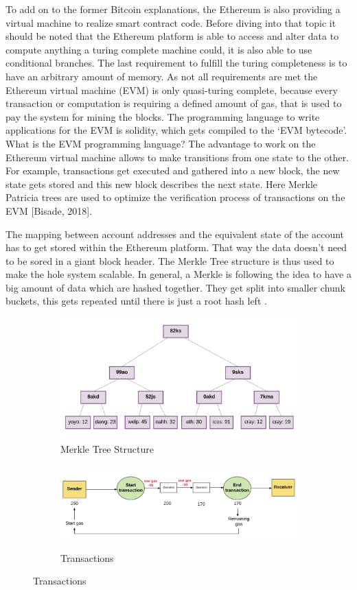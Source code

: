 To add on to the former Bitcoin explanations, the Ethereum is also providing a virtual machine to realize smart contract code. 
Before diving into that topic it should be noted that the Ethereum platform is able to access and alter data to compute anything a turing complete machine could, it is also able to use conditional branches. 
The last requirement to fulfill the turing completeness is to have an arbitrary amount of memory. 
As not all requirements are met the Ethereum virtual machine (EVM) is only quasi-turing complete, because every transaction or computation is requiring a defined amount of gas, that is used to pay the system for mining the blocks. 
The programming language to write applications for the EVM is solidity, which gets compiled to the ‘EVM bytecode’. 
What is the EVM programming language?
The advantage to work on the Ethereum virtual machine allows to make transitions from one state to the other. For example, transactions get executed and gathered into a new block, the new state gets stored and this new block describes the next state.
Here Merkle Patricia trees are used to optimize the verification process of transactions on the EVM [Bisade, 2018].

The mapping between account addresses and the equivalent state of the account has to get stored within the Ethereum platform. That way the data doesn’t need to be sored in a giant block header.
The Merkle Tree structure is thus used to make the hole system scalable. 
In general, a Merkle is following the idea to have a big amount of data which are hashed together. 
They get split into smaller chunk buckets, this gets repeated until there is just a root hash left \cite{Buterin2015}.

\begin{figure}
  \begin{subfigure}{0.5\textwidth}
    \centering
    \includegraphics[width=0.9\linewidth]{MerkleTree1.png}
    \caption{Merkle Tree Structure}
  \end{subfigure}%
  \begin{subfigure}{0.5\textwidth}
    \centering
    \includegraphics[width=0.7\linewidth, height=120px]{gastransactions.png}
  \caption{Transactions} 
  \end{subfigure}
\end{figure}

